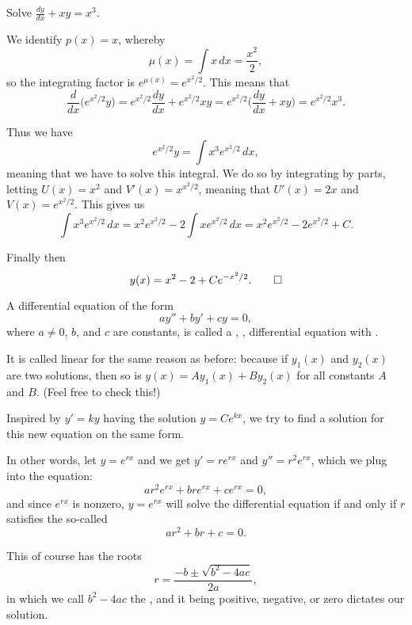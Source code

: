 \begin{example}
	Solve $\frac{d y}{d x} + x y = x^3$.

	We identify $p(x) = x$, whereby
	\[
		\mu(x) = \int x \, d x = \frac{x^2}{2},
	\]
	so the integrating factor is $e^{\mu(x)} = e^{x^2 / 2}$.
	This means that
	\[
		\frac{d}{d x} \big ( e^{x^2 / 2} y \big ) = e^{x^2 / 2} \frac{d y}{d x} + e^{x^2 / 2} x y = e^{x^2 / 2} \Big ( \frac{d y}{d x} + x y \Big ) = e^{x^2 / 2} x^3.
	\]

	\noindent
	Thus we have
	\[
		e^{x^2 / 2} y = \int x^3 e^{x^2 / 2} \, d x,
	\]
	meaning that we have to solve this integral.
	We do so by integrating by parts, letting $U(x) = x^2$ and $V'(x) = x^{x^2 / 2}$, meaning that $U'(x) = 2 x$ and $V(x) = e^{x^2 / 2}$.
	This gives us
	\[
		\int x^3 e^{x^2 / 2} \, d x = x^2 e^{x^2 / 2} - 2 \int x e^{x^2 / 2} \, d x = x^2 e^{x^2 / 2} - 2 e^{x^2 / 2} + C.
	\]

	\noindent
	Finally then
	\[
		y(x) = x^2 - 2 + C e^{-x^2 / 2}. \qedhere
	\]
\end{example}


A differential equation of the form
\[
	a y'' + b y' + c y = 0,
\]
where $a \neq 0$, $b$, and $c$ are constants, is called a , ,  differential equation with .

It is called linear for the same reason as before: because if $y_1(x)$ and $y_2(x)$ are two solutions, then so is $y(x) = A y_1(x) + B y_2(x)$ for all constants $A$ and $B$.
(Feel free to check this!)

Inspired by $y' = k y$ having the solution $y = C e^{k x}$, we try to find a solution for this new equation on the same form.

In other words, let $y = e^{r x}$ and we get $y' = r e^{r x}$ and $y'' = r^2 e^{r x}$, which we plug into the equation:
\[
	a r^2 e^{r x} + b r e^{r x} + c e^{r x} = 0,
\]
and since $e^{r x}$ is nonzero, $y = e^{r x}$ will solve the differential equation if and only if $r$ satisfies the so-called 
\[
	a r^2 + b r + c = 0.
\]

\noindent
This of course has the roots
\[
	r = \frac{- b \pm \sqrt{b^2 - 4 a c}}{2 a},
\]
in which we call $b^2 - 4 ac$ the , and it being positive, negative, or zero dictates our solution.

